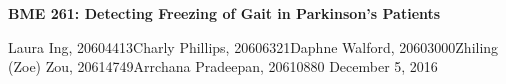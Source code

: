 \documentclass[titlepage]{article}
\begin{document}
\begin{center}
\vspace*{\fill}
\LARGE{\textbf{BME 261: Detecting Freezing of Gait in Parkinson's Patients}}
\vspace{1cm}

\Large{Laura Ing, 20604413\linebreak Charly Phillips, 20606321\linebreak Daphne Walford, 20603000\linebreak Zhiling (Zoe) Zou, 20614749\linebreak Arrchana Pradeepan, 20610880 \linebreak\linebreak December 5, 2016}
\end{center}
\vspace*{\fill}
\clearpage

\tableofcontents
\end{document}
